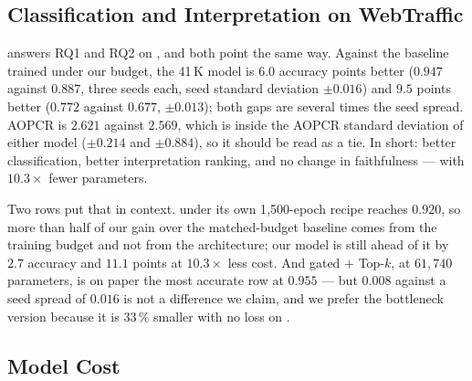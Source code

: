 \subsection{Classification and Interpretation on WebTraffic}
\label{sec:res:main}

 answers RQ1 and RQ2 on \webtraffic{}, and both point the same way. Against the
baseline trained under our budget, the 41\,K model is $6.0$ accuracy points better ($0.947$ against
$0.887$, three seeds each, seed standard deviation $\pm 0.016$) and $9.5$ \ndcg{} points better
($0.772$ against $0.677$, $\pm 0.013$); both gaps are several times the seed spread. AOPCR is $2.621$
against $2.569$, which is inside the AOPCR standard deviation of either model ($\pm 0.214$ and
$\pm 0.884$), so it should be read as a tie. In short: better classification, better interpretation
ranking, and no change in faithfulness --- with $10.3\times$ fewer parameters.

Two rows put that in context. \millet{} under its own 1{,}500-epoch recipe reaches $0.920$, so more
than half of our gain over the matched-budget baseline comes from the training budget and not from
the architecture; our model is still ahead of it by $2.7$ accuracy and $11.1$ \ndcg{} points at
$10.3\times$ less cost. And \seanet{} gated $+$ Top-$k$, at $61{,}740$ parameters, is on paper the
most accurate row at $0.955$ --- but $0.008$ against a seed spread of $0.016$ is not a difference we
claim, and we prefer the bottleneck version because it is $33\,\%$ smaller with no loss on \ndcg{}.

\subsection{Model Cost}
\label{sec:res:cost}

